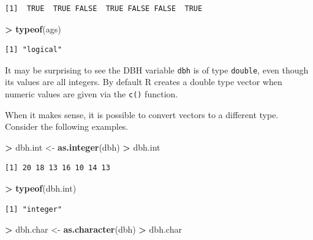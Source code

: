 \documentclass[]{krantz}
\makeatletter
\newenvironment{Shaded}{\begin{snugshade}}{\end{snugshade}}
\newcommand{\KeywordTok}[1]{\textcolor[rgb]{0.27,0.27,0.27}{\textbf{#1}}}
\newcommand{\NormalTok}[1]{#1}
\newcommand{\OperatorTok}[1]{\textcolor[rgb]{0.43,0.43,0.43}{\textbf{#1}}}
\newcommand{\StringTok}[1]{\textcolor[rgb]{0.5,0.5,0.5}{#1}}
\newenvironment{kframe}{%
\medskip{}
\setlength{\fboxsep}{.8em}
 \def\at@end@of@kframe{}%
 \ifinner\ifhmode%
  \def\at@end@of@kframe{\end{minipage}}%
  \begin{minipage}{\columnwidth}%
 \fi\fi%
 \def\FrameCommand##1{\hskip\@totalleftmargin \hskip-\fboxsep
 \colorbox{shadecolor}{##1}\hskip-\fboxsep
     \hskip-\linewidth \hskip-\@totalleftmargin \hskip\columnwidth}%
 \MakeFramed {\advance\hsize-\width
   \@totalleftmargin\z@ \linewidth\hsize
   \@setminipage}}%
 {\par\unskip\endMakeFramed%
 \at@end@of@kframe}
\renewenvironment{Shaded}{\begin{kframe}}{\end{kframe}}
\makeatother
\begin{document}
\begin{verbatim}
[1]  TRUE  TRUE FALSE  TRUE FALSE FALSE  TRUE
\end{verbatim}

\begin{Shaded}
\begin{Highlighting}[]
\OperatorTok{>}\StringTok{ }\KeywordTok{typeof}\NormalTok{(ags)}
\end{Highlighting}
\end{Shaded}

\begin{verbatim}
[1] "logical"
\end{verbatim}

It may be surprising to see the DBH variable \texttt{dbh} is of type \texttt{double}, even though its values are all integers. By default R creates a double type vector when numeric values are given via the \texttt{c()} function.

When it makes sense, it is possible to convert vectors to a different type. Consider the following examples.

\begin{Shaded}
\begin{Highlighting}[]
\OperatorTok{>}\StringTok{ }\NormalTok{dbh.int <-}\StringTok{ }\KeywordTok{as.integer}\NormalTok{(dbh)}
\OperatorTok{>}\StringTok{ }\NormalTok{dbh.int}
\end{Highlighting}
\end{Shaded}

\begin{verbatim}
[1] 20 18 13 16 10 14 13
\end{verbatim}

\begin{Shaded}
\begin{Highlighting}[]
\OperatorTok{>}\StringTok{ }\KeywordTok{typeof}\NormalTok{(dbh.int)}
\end{Highlighting}
\end{Shaded}

\begin{verbatim}
[1] "integer"
\end{verbatim}

\begin{Shaded}
\begin{Highlighting}[]
\OperatorTok{>}\StringTok{ }\NormalTok{dbh.char <-}\StringTok{ }\KeywordTok{as.character}\NormalTok{(dbh)}
\OperatorTok{>}\StringTok{ }\NormalTok{dbh.char}
\end{Highlighting}
\end{Shaded}
\end{document}

